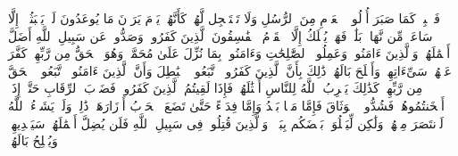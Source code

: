 \stopbuffer
\startbuffer[\q:46:35]
فَٱصۡبِرۡ كَمَا صَبَرَ أُو۟لُوا۟ ٱلۡعَزۡمِ مِنَ ٱلرُّسُلِ وَلَا تَسۡتَعۡجِل لَّهُمۡۚ كَأَنَّهُمۡ یَوۡمَ یَرَوۡنَ مَا یُوعَدُونَ لَمۡ یَلۡبَثُوۤا۟ إِلَّا سَاعَةࣰ مِّن نَّهَارِۭۚ بَلَٰغࣱۚ فَهَلۡ یُهۡلَكُ إِلَّا ٱلۡقَوۡمُ ٱلۡفَٰسِقُونَ%
\stopbuffer
\startbuffer[\q:47:1]
ٱلَّذِینَ كَفَرُوا۟ وَصَدُّوا۟ عَن سَبِیلِ ٱللَّهِ أَضَلَّ أَعۡمَٰلَهُمۡ%
\stopbuffer
\startbuffer[\q:47:2]
وَٱلَّذِینَ ءَامَنُوا۟ وَعَمِلُوا۟ ٱلصَّٰلِحَٰتِ وَءَامَنُوا۟ بِمَا نُزِّلَ عَلَىٰ مُحَمَّدࣲ وَهُوَ ٱلۡحَقُّ مِن رَّبِّهِمۡ كَفَّرَ عَنۡهُمۡ سَیِّءَاتِهِمۡ وَأَصۡلَحَ بَالَهُمۡ%
\stopbuffer
\startbuffer[\q:47:3]
ذَٰلِكَ بِأَنَّ ٱلَّذِینَ كَفَرُوا۟ ٱتَّبَعُوا۟ ٱلۡبَٰطِلَ وَأَنَّ ٱلَّذِینَ ءَامَنُوا۟ ٱتَّبَعُوا۟ ٱلۡحَقَّ مِن رَّبِّهِمۡۚ كَذَٰلِكَ یَضۡرِبُ ٱللَّهُ لِلنَّاسِ أَمۡثَٰلَهُمۡ%
\stopbuffer
\startbuffer[\q:47:4]
فَإِذَا لَقِیتُمُ ٱلَّذِینَ كَفَرُوا۟ فَضَرۡبَ ٱلرِّقَابِ حَتَّىٰۤ إِذَاۤ أَثۡخَنتُمُوهُمۡ فَشُدُّوا۟ ٱلۡوَثَاقَ فَإِمَّا مَنَّۢا بَعۡدُ وَإِمَّا فِدَاۤءً حَتَّىٰ تَضَعَ ٱلۡحَرۡبُ أَوۡزَارَهَاۚ ذَٰلِكَۖ وَلَوۡ یَشَاۤءُ ٱللَّهُ لَٱنتَصَرَ مِنۡهُمۡ وَلَٰكِن لِّیَبۡلُوَا۟ بَعۡضَكُم بِبَعۡضࣲۗ وَٱلَّذِینَ قُتِلُوا۟ فِی سَبِیلِ ٱللَّهِ فَلَن یُضِلَّ أَعۡمَٰلَهُمۡ%
\stopbuffer
\startbuffer[\q:47:5]
سَیَهۡدِیهِمۡ وَیُصۡلِحُ بَالَهُمۡ%
\stopbuffer
